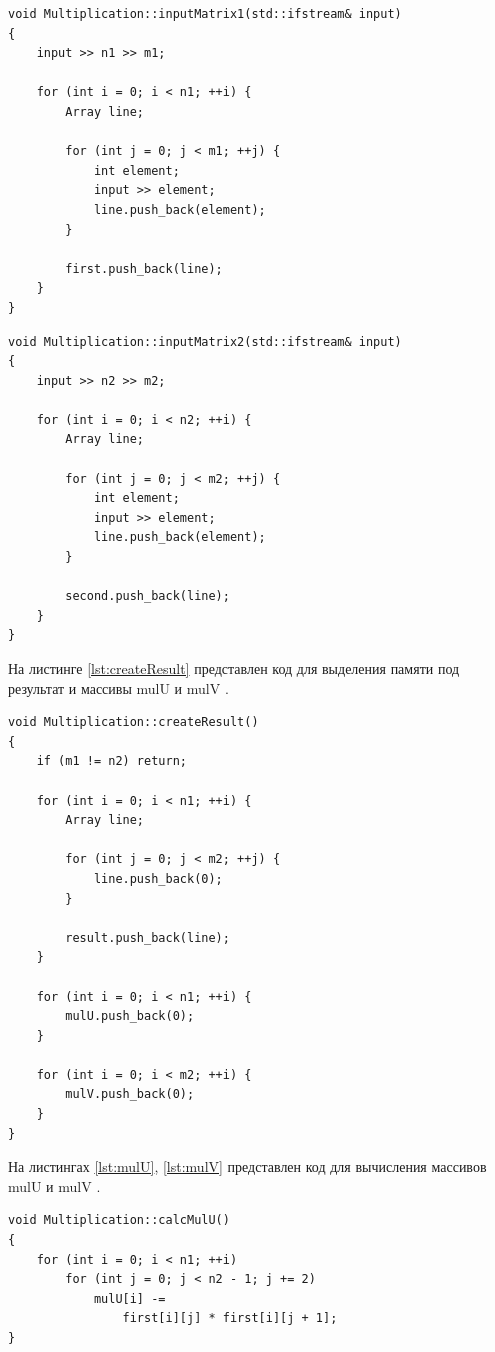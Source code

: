 \documentclass[a4paper,12pt]{article}
\begin{document}
\begin{lstlisting}[caption=Ввод первой матрицы,label=lst:inputMatrix1]
void Multiplication::inputMatrix1(std::ifstream& input)
{
    input >> n1 >> m1;

    for (int i = 0; i < n1; ++i) {
        Array line;

        for (int j = 0; j < m1; ++j) {
            int element;
            input >> element;
            line.push_back(element);
        }

        first.push_back(line);
    }
}
\end{lstlisting}

\begin{lstlisting}[caption=Ввод второй матрицы,label=lst:inputMatrix2]
void Multiplication::inputMatrix2(std::ifstream& input)
{
    input >> n2 >> m2;

    for (int i = 0; i < n2; ++i) {
        Array line;

        for (int j = 0; j < m2; ++j) {
            int element;
            input >> element;
            line.push_back(element);
        }

        second.push_back(line);
    }
}
\end{lstlisting}

На листинге \ref{lst:createResult} представлен код для выделения памяти под результат
и массивы { \ttfamily mulU } и { \ttfamily mulV }.

\begin{lstlisting}[caption=Выделение памяти для результата и дополнительных массивов,label=lst:createResult]
void Multiplication::createResult()
{
    if (m1 != n2) return;

    for (int i = 0; i < n1; ++i) {
        Array line;

        for (int j = 0; j < m2; ++j) {
            line.push_back(0);
        }

        result.push_back(line);
    }

    for (int i = 0; i < n1; ++i) {
        mulU.push_back(0);
    }

    for (int i = 0; i < m2; ++i) {
        mulV.push_back(0);
    }
}
\end{lstlisting}

На листингах \ref{lst:mulU}, \ref{lst:mulV} представлен код для вычисления
массивов { \ttfamily mulU } и { \ttfamily mulV }.

\begin{lstlisting}[caption=Подсчет { \ttfamily mulU },label=lst:mulU]
void Multiplication::calcMulU()
{
    for (int i = 0; i < n1; ++i)
        for (int j = 0; j < n2 - 1; j += 2)
            mulU[i] -=
                first[i][j] * first[i][j + 1];
}
\end{lstlisting}
\end{document}
